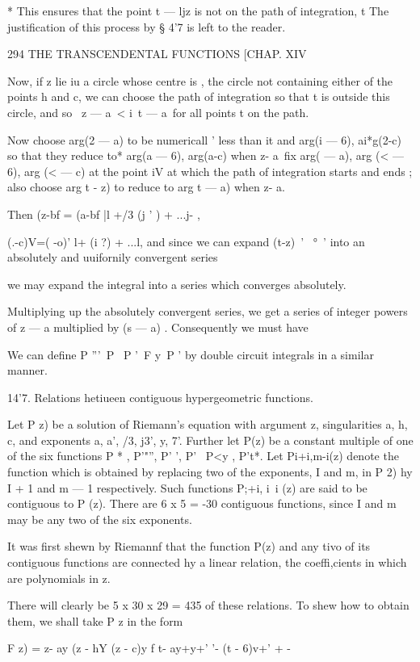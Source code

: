 * This ensures that the point t — ljz is not on the path of
integration, t The justification of this process by § 4'7 is left to
the reader.

294 THE TRANSCENDENTAL FUNCTIONS [CHAP. XIV

Now, if z lie iu a circle whose centre is , the circle not containing
either of the points h and c, we can choose the path of integration so
that t is outside this circle, and so \ z — a\ < i\ t — a\ for all
points t on the path.

Now choose arg(2 — a) to be numericall ' less than it and arg(i — 6),
ai*g(2-c) so that they reduce to* arg(a — 6), arg(a-c) when z- a\ fix
arg( — a), arg (< — 6), arg (< — c) at the point iV at which the path
of integration starts and ends ; also choose arg t - z) to reduce to
arg t — a) when z- a.

Then (z-bf = (a-bf |l +/3 (j ' ) + ...j- ,

(.-c)V=( -o)' l+ (i ?) + ...l, and since we can expand (t-z)~' ~°~'
into an absolutely and uuifornily convergent series

we may expand the integral into a series which converges absolutely.

Multiplying up the absolutely convergent series, we get a series of
integer powers of z — a multiplied by (s — a) . Consequently we must
have

We can define P '''\ P \ P '\ F y\ P ' by double circuit integrals in
a similar manner.

14'7. Relations hetiueen contiguous hypergeometric functions.

Let P z) be a solution of Riemann's equation with argument z,
singularities a, h, c, and exponents a, a', /3, j3', y, 7'. Further
let P(z) be a constant multiple of one of the six functions P * ,
P'"'', P' ', P' \ P<y , P't*. Let Pi+i,m-i(z) denote the function
which is obtained by replacing two of the exponents, I and m, in P 2)
hy I + 1 and m — 1 respectively. Such functions P;+i, i\ i (z) are
said to be contiguous to P (z). There are 6 x 5 = -30 contiguous
functions, since I and m may be any two of the six exponents.

It was first shewn by Riemannf that the function P(z) and any tivo of
its contiguous functions are connected hy a linear relation, the
coeffi,cients in which are polynomials in z.

There will clearly be 5 x 30 x 29 = 435 of these relations. To shew
how to obtain them, we shall take P z in the form

F z) = z- ay (z - hY (z - c)y f t- ay+y+' '- (t - 6)v+' + -


